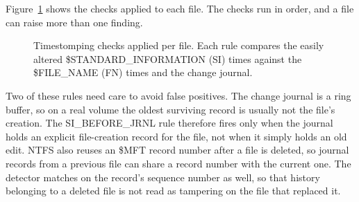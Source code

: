 \documentclass[12pt,onecolumn]{IEEEtran}
\begin{document}
Figure~\ref{fig:detect} shows the checks applied to each file. The checks run
in order, and a file can raise more than one finding.

\begin{figure}[htbp]
\centering
{}
\caption{Timestomping checks applied per file. Each rule compares the
easily altered \$STANDARD\_INFORMATION (SI) times against the \$FILE\_NAME (FN)
times and the change journal.}
\label{fig:detect}
\end{figure}

Two of these rules need care to avoid false positives. The change journal is a ring buffer, so on a real volume the oldest surviving record is usually not the file's creation. The SI\_BEFORE\_JRNL rule therefore fires only when the journal holds an explicit file-creation record for the file, not when it simply holds an old edit. NTFS also reuses an \$MFT record number after a file is deleted, so journal records from a previous file can share a record number with the current one. The detector matches on the record's sequence number as well, so that history belonging to a deleted file is not read as tampering on the file that replaced it.
\end{document}
